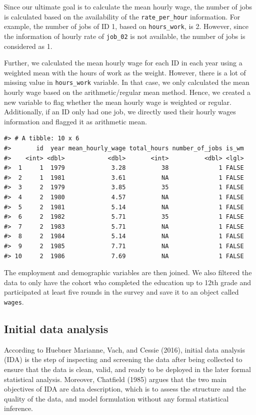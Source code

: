 \documentclass{article}
\begin{document}
Since our ultimate goal is to calculate the mean hourly wage, the number of jobs is calculated based on the availability of the \texttt{rate\_per\_hour} information. For example, the number of jobs of ID 1, based on \texttt{hours\_work}, is 2. However, since the information of hourly rate of \texttt{job\_02} is not available, the number of jobs is considered as 1.

Further, we calculated the mean hourly wage for each ID in each year using a weighted mean with the hours of work as the weight. However, there is a lot of missing value in \texttt{hours\_work} variable. In that case, we only calculated the mean hourly wage based on the arithmetic/regular mean method. Hence, we created a new variable to flag whether the mean hourly wage is weighted or regular. Additionally, if an ID only had one job, we directly used their hourly wages information and flagged it as arithmetic mean.

\begin{verbatim}
#> # A tibble: 10 x 6
#>       id  year mean_hourly_wage total_hours number_of_jobs is_wm
#>    <int> <dbl>            <dbl>       <int>          <dbl> <lgl>
#>  1     1  1979             3.28          38              1 FALSE
#>  2     1  1981             3.61          NA              1 FALSE
#>  3     2  1979             3.85          35              1 FALSE
#>  4     2  1980             4.57          NA              1 FALSE
#>  5     2  1981             5.14          NA              1 FALSE
#>  6     2  1982             5.71          35              1 FALSE
#>  7     2  1983             5.71          NA              1 FALSE
#>  8     2  1984             5.14          NA              1 FALSE
#>  9     2  1985             7.71          NA              1 FALSE
#> 10     2  1986             7.69          NA              1 FALSE
\end{verbatim}

The employment and demographic variables are then joined. We also filtered the data to only have the cohort who completed the education up to 12th grade and participated at least five rounds in the survey and save it to an object called \texttt{wages}.

\hypertarget{ida}{%
\subsection{Initial data analysis}\label{ida}}

According to Huebner Marianne, Vach, and Cessie (2016), initial data analysis (IDA) is the step of inspecting and screening the data after being collected to ensure that the data is clean, valid, and ready to be deployed in the later formal statistical analysis. Moreover, Chatfield (1985) argues that the two main objectives of IDA are data description, which is to assess the structure and the quality of the data, and model formulation without any formal statistical inference.
\end{document}
